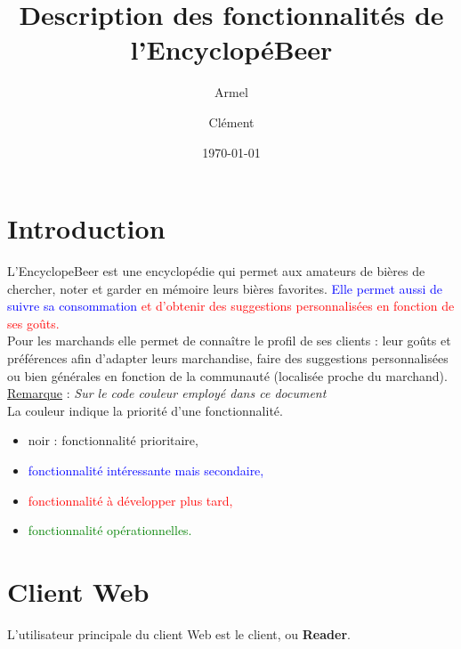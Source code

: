 \documentclass[a4paper,12pt,twoside]{article}
\title{Description des fonctionnalités de l'EncyclopéBeer}
\author{Armel \and Clément}
\date{\today}
\newcommand{\rem}[2]{\noindent\underline{Remarque} : \textit{#1}\\ \indent #2}
\begin{document}
\maketitle
\tableofcontents%

\section{Introduction}

L’EncyclopeBeer est une encyclopédie qui permet aux amateurs de bières de chercher, noter et garder en mémoire leurs bières favorites. \textcolor{blue}{Elle permet aussi de suivre sa consommation} \textcolor{red}{et d’obtenir des suggestions personnalisées en fonction de ses goûts.} \\

Pour les marchands elle permet de connaître le profil de ses clients : leur goûts et préférences afin d'adapter leurs marchandise, faire des suggestions personnalisées ou bien générales en fonction de la communauté (localisée proche du marchand). \\


\rem{Sur le code couleur employé dans ce document}{La couleur indique la priorité d'une fonctionnalité. 
\begin{itemize}
\item noir : fonctionnalité prioritaire,
\item \textcolor{blue}{fonctionnalité intéressante mais secondaire,}
\item \textcolor{red}{fonctionnalité à développer plus tard,}
\item \textcolor{green}{fonctionnalité opérationnelles.}
\end{itemize}
}

\section{Client Web}
L'utilisateur principale du client Web est le client, ou \textbf{Reader}.\\
\end{document}
